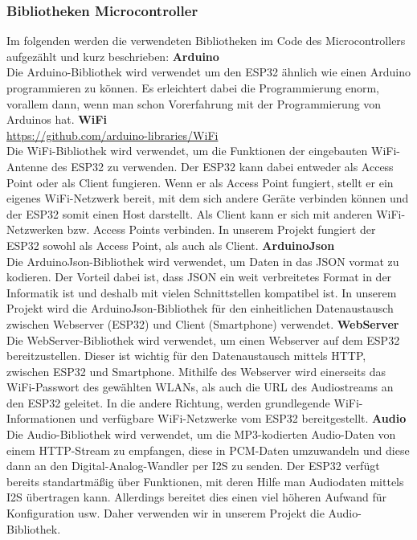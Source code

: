 \documentclass[]{article}
\begin{document}
\subsubsection{Bibliotheken Microcontroller}
Im folgenden werden die verwendeten Bibliotheken im Code des Microcontrollers aufgezählt und kurz beschrieben:
\vspace{4mm}\newline
\textbf{Arduino} \\
Die Arduino-Bibliothek wird verwendet um den ESP32 ähnlich wie einen Arduino programmieren zu können. Es erleichtert dabei die Programmierung enorm, vorallem dann, wenn man schon Vorerfahrung mit der Programmierung von Arduinos hat.
\vspace{4mm}\newline
\textbf{WiFi} \\
\url{https://github.com/arduino-libraries/WiFi} \\
Die WiFi-Bibliothek wird verwendet, um die Funktionen der eingebauten WiFi-Antenne des ESP32 zu verwenden. Der ESP32 kann dabei entweder als Access Point oder als Client fungieren. Wenn er als Access Point fungiert, stellt er ein eigenes WiFi-Netzwerk bereit, mit dem sich andere Geräte verbinden können und der ESP32 somit einen Host darstellt. Als Client kann er sich mit anderen WiFi-Netzwerken bzw. Access Points verbinden. In unserem Projekt fungiert der ESP32 sowohl als Access Point, als auch als Client.
\vspace{4mm}\newline
\textbf{ArduinoJson} \\
Die ArduinoJson-Bibliothek wird verwendet, um Daten in das JSON vormat zu kodieren. Der Vorteil dabei ist, dass JSON ein weit verbreitetes Format in der Informatik ist und deshalb mit vielen Schnittstellen kompatibel ist. In unserem Projekt wird die ArduinoJson-Bibliothek für den einheitlichen Datenaustausch zwischen Webserver (ESP32) und Client (Smartphone) verwendet.
\vspace{4mm}\newline
\textbf{WebServer} \\
Die WebServer-Bibliothek wird verwendet, um einen Webserver auf dem ESP32 bereitzustellen. Dieser ist wichtig für den Datenaustausch mittels HTTP, zwischen ESP32 und Smartphone. Mithilfe des Webserver wird einerseits das WiFi-Passwort des gewählten WLANs, als auch die URL des Audiostreams an den ESP32 geleitet. In die andere Richtung, werden grundlegende WiFi-Informationen und verfügbare WiFi-Netzwerke vom ESP32 bereitgestellt. 
\vspace{4mm}\newline
\textbf{Audio} \\
Die Audio-Bibliothek wird verwendet, um die MP3-kodierten Audio-Daten von einem HTTP-Stream zu empfangen, diese in PCM-Daten umzuwandeln und diese dann an den Digital-Analog-Wandler per I2S zu senden. Der ESP32 verfügt bereits standartmäßig über Funktionen, mit deren Hilfe man Audiodaten mittels I2S übertragen kann. Allerdings bereitet dies einen viel höheren Aufwand für Konfiguration usw. Daher verwenden wir in unserem Projekt die Audio-Bibliothek.
\end{document}

